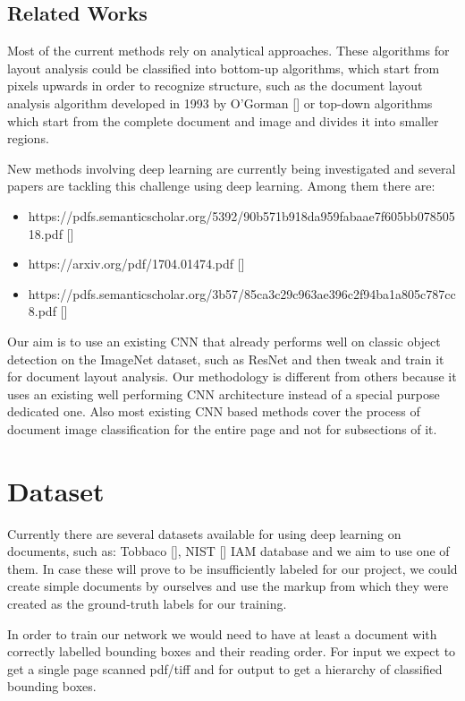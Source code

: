\documentclass[10pt,twocolumn,letterpaper]{article}
\begin{document}
\subsection{Related Works}
Most of the current methods rely on analytical approaches. These algorithms for layout analysis could be classified into bottom-up algorithms, which start from pixels upwards in order to recognize structure, such as the document layout analysis algorithm developed in 1993 by O'Gorman [] or top-down algorithms which start from the complete document and image and divides it into smaller regions.

New methods involving deep learning are currently being investigated and several papers are tackling this challenge using deep learning. Among them there are:
\begin{itemize}
	\item https://pdfs.semanticscholar.org/5392/90b571b918da959fabaae7f605bb07850518.pdf []
	\item https://arxiv.org/pdf/1704.01474.pdf []
	\item https://pdfs.semanticscholar.org/3b57/85ca3c29c963ae396c2f94ba1a805c787cc8.pdf []
\end{itemize}

Our aim is to use an existing CNN that already performs well on classic object detection on the ImageNet dataset, such as ResNet and then tweak and train it for document layout analysis. Our methodology is different from others because it uses an existing well performing CNN architecture instead of a special purpose dedicated one. Also most existing CNN based methods cover the process of document image classification for the entire page and not for subsections of it.

\section{Dataset}
Currently there are several datasets available for using deep learning on documents, such as: Tobbaco [], NIST [] IAM database and we aim to use one of them. In case these will prove to be insufficiently labeled for our project, we could create simple documents by ourselves and use the markup from which they were created as the ground-truth labels for our training. 

In order to train our network we would need to have at least a document with correctly labelled bounding boxes and their reading order. For input we expect to get a single page scanned pdf/tiff and for output to get a hierarchy of classified bounding boxes.
\end{document}
